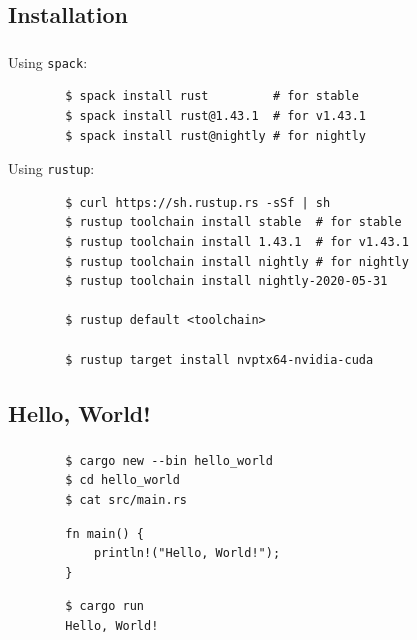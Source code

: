 \documentclass[aspectratio=43, t]{beamer}
\begin{document}
\subsection*{Installation}
\begin{frame}[fragile]
	\frametitle{\subsecname}

	Using \texttt{spack}:
	\begin{verbatim}
		$ spack install rust         # for stable
		$ spack install rust@1.43.1  # for v1.43.1
		$ spack install rust@nightly # for nightly
	\end{verbatim}

	Using \texttt{rustup}:
	\begin{verbatim}
		$ curl https://sh.rustup.rs -sSf | sh
		$ rustup toolchain install stable  # for stable
		$ rustup toolchain install 1.43.1  # for v1.43.1
		$ rustup toolchain install nightly # for nightly
		$ rustup toolchain install nightly-2020-05-31

		$ rustup default <toolchain>

		$ rustup target install nvptx64-nvidia-cuda
	\end{verbatim}
\end{frame}

\subsection*{Hello, World!}
\begin{frame}[fragile]
	\frametitle{\subsecname}

	\begin{verbatim}
		$ cargo new --bin hello_world
		$ cd hello_world
		$ cat src/main.rs
	\end{verbatim}

	\begin{verbatim}
		fn main() {
		    println!("Hello, World!");
		}
	\end{verbatim}

	\begin{verbatim}
		$ cargo run
		Hello, World!
	\end{verbatim}
\end{frame}
\end{document}
